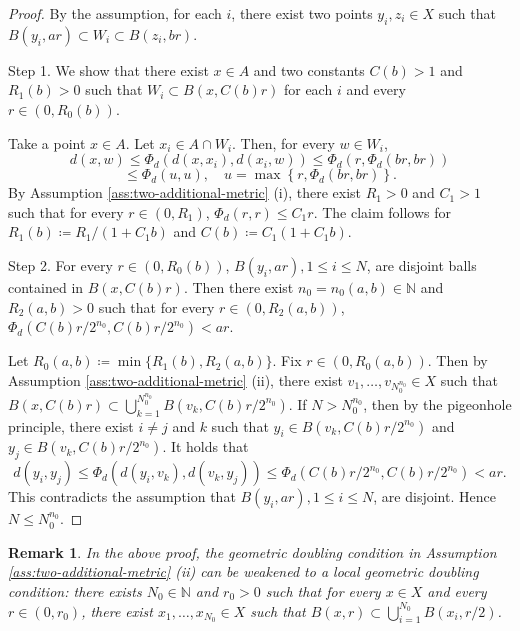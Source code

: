 \documentclass[10pt,a4paper]{amsart}
\newtheorem{Rem}[Thm]{Remark}
\begin{document}
\begin{proof}
By the assumption, for each $i$, there exist two points $y_i, z_i \in X$ such that $B(y_i, ar) \subset W_i \subset B(z_i, br)$. 

Step 1. We show that there exist $x \in A$  and  two constants $C(b) >  1$ and $R_1 (b) > 0$ such that $W_i \subset B(x, C(b) r)$ for each $i$ and every $r \in (0, R_0 (b))$. 

Take a point $x \in A$. 
Let $x_i \in A \cap W_i$.   
Then, for every $w \in W_i$, 
\[ d(x,w) \le \Phi_d (d(x,x_i), d(x_i,w)) \le \Phi_d \left(r, \Phi_d (br, br)\right)\]
\[  \le  \Phi_d \left(u,  u\right), \quad u = \max\left\{r, \Phi_d (br,br)\right\}. \]
By Assumption \ref{ass:two-additional-metric} (i), 
there exist $R_1 > 0$ and $C_1 > 1$ such that for every $r \in (0, R_1)$, $\Phi_d (r,r) \le C_1 r$. 
The claim follows for $R_1 (b) \coloneqq R_1/(1+ C_1 b)$ and $C(b) \coloneqq C_1 (1+ C_1 b) $. 

Step 2. For every $r \in (0, R_0 (b))$, $B(y_i, ar), 1 \le i \le N$, are disjoint balls  contained in $B(x, C(b) r)$. 
Then there exist $n_0 = n_0 (a,b) \in \mathbb{N}$ and $R_2 (a,b) > 0$ such that for every $r \in (0, R_2 (a,b))$,  $\Phi_d (C(b) r/2^{n_0}, C(b) r/2^{n_0}) < ar$. 

Let $R_0 (a,b) \coloneqq \min\{R_1 (b), R_2 (a,b) \}$. 
Fix $r \in \left(0, R_0 (a,b)\right)$. 
Then by Assumption \ref{ass:two-additional-metric} (ii), 
there exist $v_1, \dots, v_{N_0^{n_0}} \in X$ such that $B(x,C(b)r) \subset \bigcup_{k=1}^{N_0^{n_0}} B(v_k, C(b) r/2^{n_0})$. 
If $N > N_0^{n_0}$, then by the pigeonhole principle, there exist $i \ne j$ and $k$ such that $y_i \in B(v_k, C(b) r/2^{n_0})$ and $y_j \in B(v_k, C(b) r/2^{n_0})$. 
It holds that 
\[  d(y_i, y_j) \le \Phi_d (d(y_i, v_k), d(v_k, y_j)) \le \Phi_d (C(b) r/2^{n_0}, C(b) r/2^{n_0}) < ar. \]
This contradicts the assumption that $B(y_i, ar), 1 \le i \le N$, are disjoint. 
Hence $N \le N_0^{n_0}$. 
\end{proof}

\begin{Rem}
In the above proof, the geometric doubling condition in Assumption \ref{ass:two-additional-metric} (ii) can be weakened to a {\it local} geometric doubling condition: 
there exists $N_0 \in \mathbb{N}$ and $r_0 > 0$ such that for every $x \in X$ and every $r \in (0, r_0)$, there exist $x_1, \dots, x_{N_0} \in X$ such that $B(x,r) \subset \bigcup_{i=1}^{N_0} B(x_i, r/2)$. 
\end{Rem}
\end{document}
